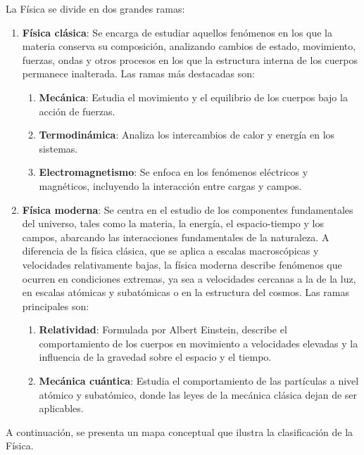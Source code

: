 La Física se divide en dos grandes ramas:
\begin{enumerate}[label=\textbf{\arabic*.}]
    \item \textbf{Física clásica}: Se encarga de estudiar aquellos fenómenos en los que la materia conserva su composición, analizando cambios de estado, movimiento, fuerzas, ondas y otros procesos en los que la estructura interna de los cuerpos permanece inalterada. Las ramas más destacadas son:
    \begin{enumerate}[label=\textbf{\alph*)}]
        \item \textbf{Mecánica}: Estudia el movimiento y el equilibrio de los cuerpos bajo la acción de fuerzas.
        \item \textbf{Termodinámica}: Analiza los intercambios de calor y energía en los sistemas.
        \item \textbf{Electromagnetismo}: Se enfoca en los fenómenos eléctricos y magnéticos, incluyendo la interacción entre cargas y campos.
    \end{enumerate}
    
    \item \textbf{Física moderna}: Se centra en el estudio de los componentes fundamentales del universo, tales como la materia, la energía, el espacio-tiempo y los campos, abarcando las interacciones fundamentales de la naturaleza. A diferencia de la física clásica, que se aplica a escalas macroscópicas y velocidades relativamente bajas, la física moderna describe fenómenos que ocurren en condiciones extremas, ya sea a velocidades cercanas a la de la luz, en escalas atómicas y subatómicas o en la estructura del cosmos. Las ramas principales son:
    \begin{enumerate}[label=\textbf{\alph*)}]
        \item \textbf{Relatividad}: Formulada por Albert Einstein, describe el comportamiento de los cuerpos en movimiento a velocidades elevadas y la influencia de la gravedad sobre el espacio y el tiempo.
        \item \textbf{Mecánica cuántica}: Estudia el comportamiento de las partículas a nivel atómico y subatómico, donde las leyes de la mecánica clásica dejan de ser aplicables.
    \end{enumerate}
\end{enumerate}

A continuación, se presenta un mapa conceptual que ilustra la clasificación de la Física.

